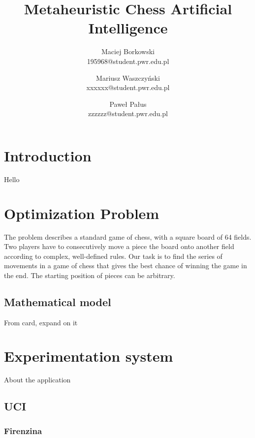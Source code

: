 \documentclass[pdftex]{article}
\date{}
\title{Metaheuristic Chess Artificial Intelligence}
\author{Maciej Borkowski\\ 195968@student.pwr.edu.pl  \and Mariusz Waszczyński\\  xxxxxx@student.pwr.edu.pl \and Paweł Pałus\\ zzzzzz@student.pwr.edu.pl}
\begin{document}
\thispagestyle{empty}

\section{Introduction}
\label{sec:introduction}

Hello

\section{Optimization Problem}
\label{sec:problem}

The problem describes a standard game of chess, with a square board of 64 fields. Two players have to consecutively move a piece the board onto another field according to complex, well-defined rules. Our task is to find the series of movements in a game of chess that gives the best chance of winning the game in the end. The starting position of pieces can be arbitrary.

\subsection{Mathematical model}
\label{sec:model}

From card, expand on it

\section{Experimentation system}
\label{sec:project}

About the application

\subsection{UCI}
\label{sec:uci}

\subsubsection{Firenzina}
\label{sec:firenzina}
\end{document}

